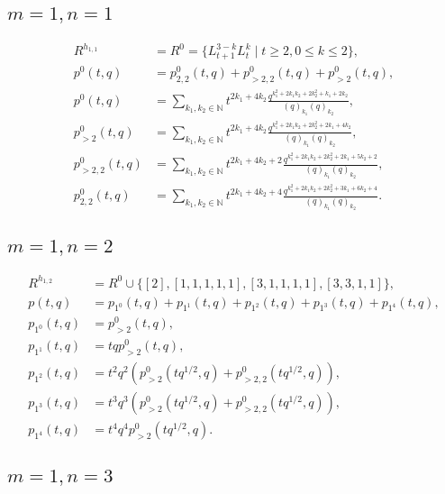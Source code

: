 \documentclass[a4paper, 12pt, reqno]{amsart}
\begin{document}
\subsection{$m = 1, n = 1$}
\label{sec:m-=-1-2}

\begin{align*}
  R^{h_{1, 1}} &= R^0 = \{L_{t + 1}^{3 - k}L_t^k \mid t \ge 2, 0 \le k \le 2\}, \\
  p^0(t, q) &= p^0_{2, 2}(t, q) + p^0_{>2, 2}(t, q) + p^0_{>2}(t, q), \\
  p^0(t, q) &= \sum_{k_1, k_2 \in \mathbb{N}}t^{2k_1 + 4k_2}\frac{q^{k_1^2 + 2k_1k_2 + 2k_2^2 + k_1 + 2k_2}}{(q)_{k_1}(q)_{k_2}}, \\
  p^0_{>2}(t, q) &= \sum_{k_1, k_2 \in \mathbb{N}}t^{2k_1 + 4k_2}\frac{q^{k_1^2 + 2k_1k_2 + 2k_2^2 + 2k_1 + 4k_2}}{(q)_{k_1}(q)_{k_2}}, \\
  p^0_{>2, 2}(t, q) &= \sum_{k_1, k_2 \in \mathbb{N}}t^{2k_1 + 4k_2 + 2}\frac{q^{k_1^2 + 2k_1k_2 + 2k_2^2 + 2k_1 + 5k_2 + 2}}{(q)_{k_1}(q)_{k_2}}, \\
  p^0_{2, 2}(t, q) &= \sum_{k_1, k_2 \in \mathbb{N}}t^{2k_1 + 4k_2 + 4}\frac{q^{k_1^2 + 2k_1k_2 + 2k_2^2 + 3k_1 + 6k_2 + 4}}{(q)_{k_1}(q)_{k_2}}.
\end{align*}

\subsection{$m = 1, n = 2$}
\label{sec:m-=-1-3}

\begin{align*}
  R^{h_{1, 2}} &= R^0 \cup \{[2], [1, 1, 1, 1, 1], [3, 1, 1, 1, 1], [3, 3, 1, 1]\}, \\
  p(t, q) &= p_{1^0}(t, q) + p_{1^1}(t, q) + p_{1^2}(t, q) + p_{1^3}(t, q) + p_{1^4}(t, q), \\
  p_{1^0}(t, q) &= p^0_{>2}(t, q), \\
  p_{1^1}(t, q) &= tqp^0_{>2}(t, q), \\
  p_{1^2}(t, q) &= t^2q^2(p^0_{>2}(tq^{1/2}, q) + p^0_{>2, 2}(tq^{1/2}, q)), \\
  p_{1^3}(t, q) &= t^3q^3(p^0_{>2}(tq^{1/2}, q) + p^0_{>2, 2}(tq^{1/2}, q)), \\
  p_{1^4}(t, q) &= t^4q^4p^0_{>2}(tq^{1/2}, q).
\end{align*}

\subsection{$m = 1, n = 3$}
\label{sec:m-=-1-4}
\end{document}
